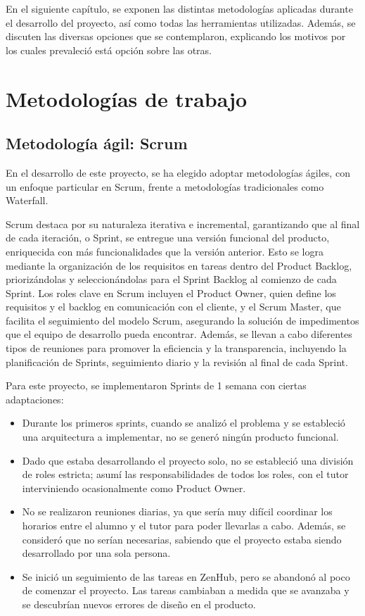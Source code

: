 
En el siguiente capítulo, se exponen las distintas metodologías aplicadas durante el desarrollo del proyecto, así como todas las herramientas utilizadas. Además, se discuten las diversas opciones que se contemplaron, explicando los motivos por los cuales prevaleció está opción sobre las otras.


\section{Metodologías de trabajo}

\subsection{Metodología ágil: Scrum}

En el desarrollo de este proyecto, se ha elegido adoptar metodologías ágiles, con un enfoque particular en Scrum\cite{ScrumAgile}, frente a metodologías tradicionales como Waterfall.

Scrum destaca por su naturaleza iterativa e incremental, garantizando que al final de cada iteración, o Sprint, se entregue una versión funcional del producto, enriquecida con más funcionalidades que la versión anterior. Esto se logra mediante la organización de los requisitos en tareas dentro del Product Backlog, priorizándolas y seleccionándolas para el Sprint Backlog al comienzo de cada Sprint. Los roles clave en Scrum incluyen el Product Owner, quien define los requisitos y el backlog en comunicación con el cliente, y el Scrum Master, que facilita el seguimiento del modelo Scrum, asegurando la solución de impedimentos que el equipo de desarrollo pueda encontrar. Además, se llevan a cabo diferentes tipos de reuniones para promover la eficiencia y la transparencia, incluyendo la planificación de Sprints, seguimiento diario y la revisión al final de cada Sprint.

Para este proyecto, se implementaron Sprints de 1 semana con ciertas adaptaciones:

\begin{itemize}
    \item Durante los primeros sprints, cuando se analizó el problema y se estableció una arquitectura a implementar, no se generó ningún producto funcional.
    \item Dado que estaba desarrollando el proyecto solo, no se estableció una división de roles estricta; asumí las responsabilidades de todos los roles, con el tutor interviniendo ocasionalmente como Product Owner.
    \item No se realizaron reuniones diarias, ya que sería muy difícil coordinar los horarios entre el alumno y el tutor para poder llevarlas a cabo. Además, se consideró que no serían necesarias, sabiendo que el proyecto estaba siendo desarrollado por una sola persona.
    \item Se inició un seguimiento de las tareas en ZenHub, pero se abandonó al poco de comenzar el proyecto. Las tareas cambiaban a medida que se avanzaba y se descubrían nuevos errores de diseño en el producto.
\end{itemize}

